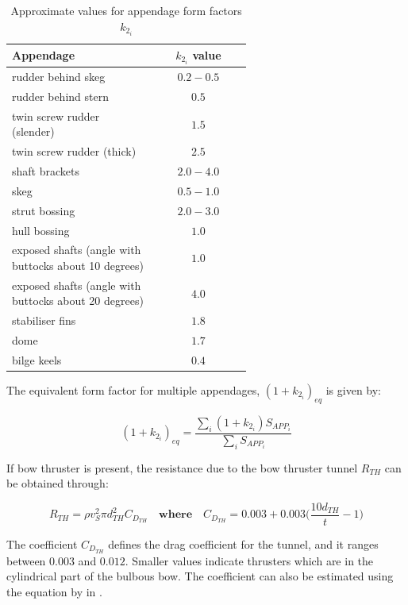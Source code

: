 \begin{table}[ht]
    \footnotesize
    \centering
    {\begin{tabular}{ p{0.6\linewidth} c}
    \hline
    Appendage & $k_{2_i}$ value \\
    \hline
    rudder behind skeg & $0.2-0.5$ \\
    rudder behind stern & $0.5$ \\
    twin screw rudder (slender) & $1.5$ \\
    twin screw rudder (thick) & $2.5$ \\
    shaft brackets & $2.0-4.0$ \\
    skeg & $0.5-1.0$ \\
    strut bossing & $2.0-3.0$ \\
    hull bossing & $1.0$ \\
    exposed shafts (angle with buttocks about 10 degrees) & $1.0$ \\
    exposed shafts (angle with buttocks about 20 degrees) & $4.0$ \\
    stabiliser fins & $1.8$ \\
    dome & $1.7$ \\
    bilge keels & $0.4$ \\ 
    \hline
    \end{tabular}}
\caption{Approximate values for appendage form factors $k_{2_i}$}\label{tbl:k2i_values}
\end{table}

The equivalent form factor for multiple appendages, $(1+k_{2_i})_{eq}$ is given by:

\begin{equation}\label{eqn:k2eq}
    (1+k_{2_i})_{eq} = \frac{\sum_i(1+k_{2_i})S_{APP_i}}{\sum_iS_{APP_i}}
\end{equation}

If bow thruster is present, the resistance due to the bow thruster tunnel $R_{TH}$ can be obtained through:

\begin{equation}\label{eqn:R_th}
    R_{TH} = \rho v_S^2 \pi d_{TH}^2 C_{D_{TH}} \quad \textbf{where} \quad C_{D_{TH}} = 0.003 + 0.003 \Biggl( \frac{10{d_{TH}}}{t} - 1 \Biggr) 
\end{equation}

The coefficient $C_{D_{TH}}$ defines the drag coefficient for the tunnel, and it ranges between $0.003$ and $0.012$. Smaller values indicate thrusters which are in the cylindrical part of the bulbous bow. The coefficient can also be estimated using the equation by  in .\\


